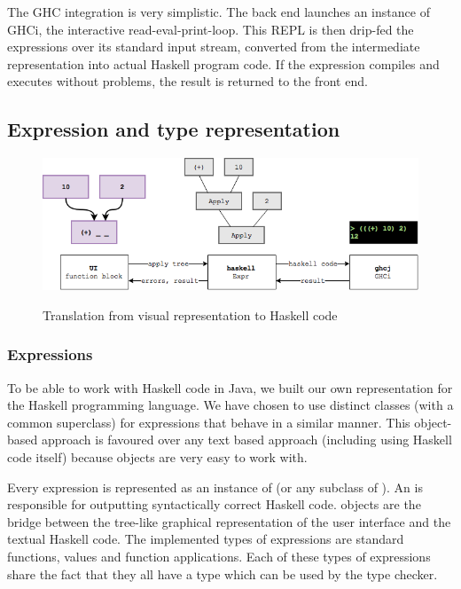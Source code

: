 The GHC integration is very simplistic.
The back end launches an instance of GHCi, the interactive read-eval-print-loop. 
This \gls{REPL} is then drip-fed the expressions over its standard input stream, converted from the intermediate representation into actual Haskell program code.
If the expression compiles and executes without problems, the result is returned to the front end.

\subsection{Expression and type representation}

\begin{figure}[h]
	\centering
	\includegraphics[scale=0.5]{Images/exprtohaskell}
	\label{fig:classdiagram-expr}
	\caption{Translation from visual representation to Haskell code}
\end{figure}

\subsubsection{Expressions}
 

To be able to work with Haskell code in Java, we built our own representation for the Haskell programming language.
We have chosen to use distinct classes (with a common superclass) for expressions that behave in a similar manner.
This object-based approach is favoured over any text based approach (including using Haskell code itself) because objects are very easy to work with.

Every expression is represented as an instance of  (or any subclass of ). 
An  is responsible for outputting syntactically correct Haskell code.  objects are the bridge between the tree-like graphical representation of the user interface and the textual Haskell code.
The implemented types of expressions are standard functions, values and function applications.
Each of these types of expressions share the fact that they all have a type which can be used by the type checker.

